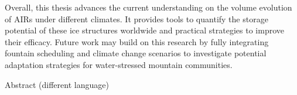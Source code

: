 Overall, this thesis advances the current understanding on the volume evolution of AIRs under different
climates. It provides tools to quantify the storage potential of these ice structures worldwide and practical
strategies to improve their efficacy. Future work may build on this research by fully integrating fountain
scheduling and climate change scenarios to investigate potential adaptation strategies for water-stressed
mountain communities.

\vspace*{20mm}

{Abstract (different language)}
\label{sec:abstract-diff}

\blindtext
